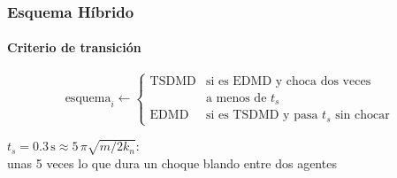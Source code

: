\documentclass[11pt,aspectratio=169]{beamer}
\newcommand{\un}[1]{\,\mathrm{#1}}          %
\newenvironment{cuerpo}[1][0.88\textwidth]{%
  \par\vspace{0.2em}\begin{center}\begin{minipage}{#1}}%
  {\end{minipage}\end{center}}
\newcommand{\anexo}[2]{\hyperlink{#1}{\beamergotobutton{#2}}}
\begin{document}
\begin{frame}[label=intro-criterio-ec]
  \frametitle{Esquema Híbrido}
  \framesubtitle{Criterio de transición}

  \vfill
  \begin{cuerpo}[0.86\textwidth]
    {\large
    \[
      \text{esquema}_i\leftarrow
      \begin{cases}
        \text{TSDMD} & \text{si es EDMD y choca dos veces}\\
                     & \text{a menos de } t_s\\[8pt]
        \text{EDMD}  & \text{si es TSDMD y pasa } t_s \text{ sin chocar}
      \end{cases}
    \]}
    \vspace{0.8em}
    {\centering\small
    $t_s=0.3\un{s}\approx5\,\pi\sqrt{m/2k_n}$:\\
    unas 5 veces lo que dura un choque blando entre dos agentes\par
    \vspace{0.6em}
    \anexo{anx-criterio}{Por qué}\par}
  \end{cuerpo}
  \vfill
\end{frame}
\end{document}
